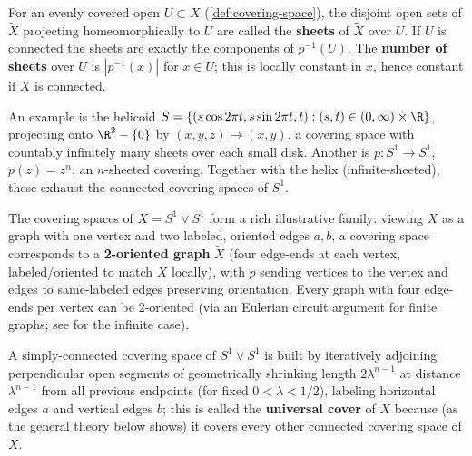 \begin{definition}
\label{def:covering-space-sheets}
For an evenly covered open $U \subset X$ (\cref{def:covering-space}), the disjoint open
sets of $\tilde X$ projecting homeomorphically to $U$ are called the \textbf{sheets} of
$\tilde X$ over $U$. If $U$ is connected the sheets are exactly the components of
$p^{-1}(U)$. The \textbf{number of sheets} over $U$ is $|p^{-1}(x)|$ for $x \in U$; this is
locally constant in $x$, hence constant if $X$ is connected.
\end{definition}

An example is the helicoid $S = \{(s\cos 2\pi t, s\sin 2\pi t, t) : (s,t) \in (0,\infty)\times\R\}$,
projecting onto $\R^2-\{0\}$ by $(x,y,z)\mapsto(x,y)$, a covering space with
countably infinitely many sheets over each small disk. Another is
$p : S^1 \to S^1$, $p(z) = z^n$, an $n$-sheeted covering. Together with the helix
(infinite-sheeted), these exhaust the connected covering spaces of $S^1$.

The covering spaces of $X = S^1\vee S^1$ form a rich illustrative family: viewing $X$
as a graph with one vertex and two labeled, oriented edges $a,b$, a covering space
corresponds to a \textbf{2-oriented graph} $\tilde X$ (four edge-ends at each vertex,
labeled/oriented to match $X$ locally), with $p$ sending vertices to the vertex and
edges to same-labeled edges preserving orientation. Every graph with four edge-ends
per vertex can be 2-oriented (via an Eulerian circuit argument for finite graphs; see
\cite{Konig1990} for the infinite case).



A simply-connected covering space of $S^1\vee S^1$ is built by iteratively adjoining
perpendicular open segments of geometrically shrinking length $2\lambda^{n-1}$ at
distance $\lambda^{n-1}$ from all previous endpoints (for fixed $0<\lambda<1/2$),
labeling horizontal edges $a$ and vertical edges $b$; this is called the
\textbf{universal cover} of $X$ because (as the general theory below shows) it covers
every other connected covering space of $X$.



